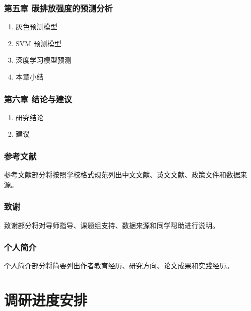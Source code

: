 \documentclass[UTF8,a4paper,zihao=-4,fontset=windows]{ctexart}
\begin{document}
\subsubsection*{第五章 碳排放强度的预测分析}
\begin{enumerate}[label=5.\arabic*]
  \item 灰色预测模型
  \item SVM 预测模型
  \item 深度学习模型预测
  \item 本章小结
\end{enumerate}

\subsubsection*{第六章 结论与建议}
\begin{enumerate}[label=6.\arabic*]
  \item 研究结论
  \item 建议
\end{enumerate}

\subsubsection*{参考文献}

参考文献部分将按照学校格式规范列出中文文献、英文文献、政策文件和数据来源。

\subsubsection*{致谢}

致谢部分将对导师指导、课题组支持、数据来源和同学帮助进行说明。

\subsubsection*{个人简介}

个人简介部分将简要列出作者教育经历、研究方向、论文成果和实践经历。

\section{调研进度安排}
\end{document}
